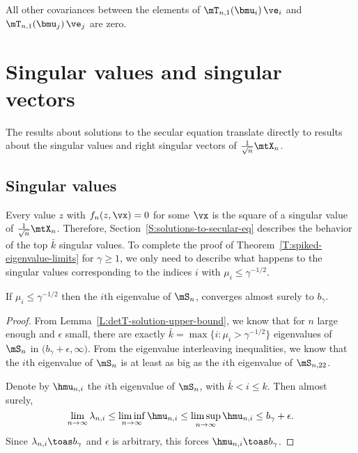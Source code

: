 All other covariances between the elements of
$\mT_{n,1}(\bmu_i) \, \ve_i$ and $\mT_{n,1}(\bmu_j) \, \ve_j$ are zero.

\section{Singular values and singular vectors}\label{S:singular-values-and-vectors}

The results about solutions to the secular equation translate directly
to results about the singular values and right singular vectors of
$\frac{1}{\sqrt{n}} \mtX_n$.

\subsection{Singular values}

Every value $z$ with $f_n(z, \vx) = 0$ for some $\vx$ is the square of a
singular value of $\frac{1}{\sqrt{n}} \mtX_n$.  Therefore,  Section~\ref{S:solutions-to-secular-eq} describes the behavior of the top $\bar k$ singular values.  To complete the proof of Theorem~\ref{T:spiked-eigenvalue-limits} for $\gamma \geq 1$, we only need to describe what happens to the singular values corresponding to the indices $i$ with $\mu_i \leq \gamma^{-1/2}$.

\begin{lemma}\label{L:eigenvalue-below-threshold-limit}
    If $\mu_i \leq \gamma^{-1/2}$ then the $i$th eigenvalue of
    $\mS_n$, converges almost surely to $b_\gamma$.
\end{lemma}
\begin{proof}
From Lemma~\ref{L:detT-solution-upper-bound}, we know that for $n$ large
enough and $\epsilon$ small, there are exactly
$\bar k = \max \{ i : \mu_i > \gamma^{-1/2} \}$ eigenvalues of $\mS_n$
in $\big( b_\gamma + \epsilon, \infty)$.  From the eigenvalue interleaving
inequalities, we know that the $i$th eigenvalue of $\mS_n$ is at least as
big as the $i$th eigenvalue of $\mS_{n,22}$.  

Denote by $\hmu_{n,i}$ the $i$th eigenvalue of $\mS_n$, with
$\bar k < i \leq k$.  Then almost surely,
\[
    \lim_{n\to\infty} \lambda_{n,i} 
        \leq
        \liminf_{n\to\infty} \hmu_{n,i}
        \leq
        \limsup_{n\to\infty} \hmu_{n,i}        
        \leq
        b_\gamma + \epsilon.
\]
Since $\lambda_{n,i} \toas b_\gamma$ and $\epsilon$ is arbitrary, this
forces $\hmu_{n,i} \toas b_\gamma$.
\end{proof}

